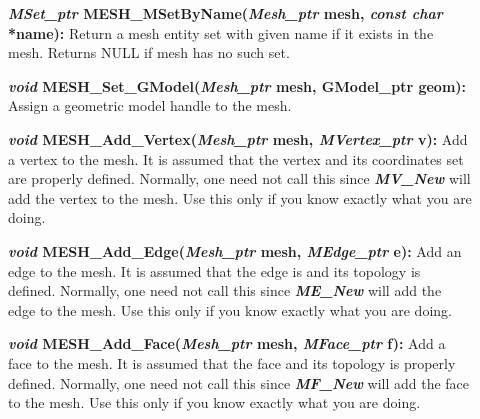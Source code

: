 \documentclass[12pt]{article}
\begin{document}
\begin{description}
\item[]{\bf {\em MSet\_ptr}
    MESH\_MSetByName({\em Mesh\_ptr} mesh, {\em const char}
    *name):} Return a mesh entity set with given name if it exists in
  the mesh. Returns NULL if mesh has no such set.

\item[]
  

\item[]{\bf {\em void} MESH\_Set\_GModel({\em Mesh\_ptr} mesh,
GModel\_ptr geom):} Assign a geometric model handle to the mesh.


\item[]

\item[]{\bf {\em void} MESH\_Add\_Vertex({\em Mesh\_ptr}
    mesh, {\em MVertex\_ptr} v):} Add a vertex to the mesh. It is
  assumed that the vertex and its coordinates set are properly
  defined. Normally, one need not call this since
  {\bf {\em MV\_New}} will add the vertex to the mesh. Use this
  only if you know exactly what you are doing.

\item[]{\bf {\em void} MESH\_Add\_Edge({\em Mesh\_ptr} mesh,
    {\em MEdge\_ptr} e):} Add an edge to the mesh. It is assumed
  that the edge is and its topology is defined. Normally, one need not
  call this since {\bf {\em ME\_New}} will add the edge to the
  mesh. Use this only if you know exactly what you are doing.

\item[]{\bf {\em void} MESH\_Add\_Face({\em Mesh\_ptr} mesh,
    {\em MFace\_ptr} f):} Add a face to the mesh. It is assumed
  that the face and its topology is properly defined. Normally, one
  need not call this since {\bf {\em MF\_New}} will add the face
  to the mesh. Use this only if you know exactly what you are doing.


\end{description}
\end{document}
